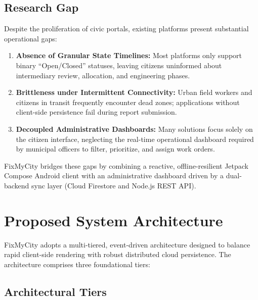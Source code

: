 \documentclass[conference]{IEEEtran}
\begin{document}
\subsection{Research Gap}

Despite the proliferation of civic portals, existing platforms present substantial operational gaps:
\begin{enumerate}
    \item \textbf{Absence of Granular State Timelines:} Most platforms only support binary ``Open/Closed'' statuses, leaving citizens uninformed about intermediary review, allocation, and engineering phases.
    \item \textbf{Brittleness under Intermittent Connectivity:} Urban field workers and citizens in transit frequently encounter dead zones; applications without client-side persistence fail during report submission.
    \item \textbf{Decoupled Administrative Dashboards:} Many solutions focus solely on the citizen interface, neglecting the real-time operational dashboard required by municipal officers to filter, prioritize, and assign work orders.
\end{enumerate}

FixMyCity bridges these gaps by combining a reactive, offline-resilient Jetpack Compose Android client with an administrative dashboard driven by a dual-backend sync layer (Cloud Firestore and Node.js REST API).

\section{Proposed System Architecture}

FixMyCity adopts a multi-tiered, event-driven architecture designed to balance rapid client-side rendering with robust distributed cloud persistence. The architecture comprises three foundational tiers:

\subsection{Architectural Tiers}
\end{document}
